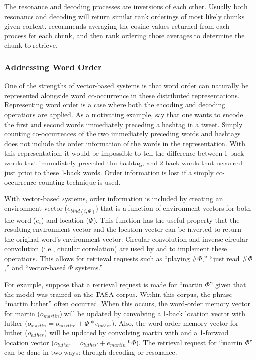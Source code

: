\documentclass[man,floatsintext,donotrepeattitle]{apa6}
\begin{document}
The resonance and decoding processes are inversions of each other.
Usually both resonance and decoding will return similar rank orderings of most likely chunks given context.
\textcite{Jones2007} recommends averaging the cosine values returned from each process for each chunk, and then rank ordering those averages to determine the chunk to retrieve.

\subsubsection{Addressing Word Order}

One of the strengths of vector-based systems is that word order can naturally be represented alongside word co-occurrence in these distributed representations.
Representing word order is a case where both the encoding and decoding operations are applied.
As a motivating example, say that one wants to encode the first and second words immediately preceding a hashtag in a tweet.
Simply counting co-occurrences of the two immediately preceding words and hashtags does not include the order information of the words in the representation.
With this representation, it would be impossible to tell the difference between 1-back words that immediately preceded the hashtag, and 2-back words that occurred just prior to these 1-back words.
Order information is lost if a simply co-occurrence counting technique is used.

With vector-based systems, order information is included by creating an environment vector ($e_{bind(i,\Phi)}$) that is a function of environment vectors for both the word ($e_{i}$) and location ($\Phi$).
This function has the useful property that the resulting environment vector and the location vector can be inverted to return the original word's environment vector.
Circular convolution and inverse circular convolution (i.e., circular correlation) are used by \textcite{Plate1995} and \textcite{Jones2007} to implement these operations.
This allows for retrieval requests such as ``playing \#$\Phi$,'' ``just read \#$\Phi$,'' and ``vector-based $\Phi$ systems.''

For example, suppose that a retrieval request is made for ``martin $\Phi$'' given that the model was trained on the TASA corpus.
Within this corpus, the phrase ``martin luther'' often occurred.
When this occurs, the word-order memory vector for martin ($o_{martin}$) will be updated by convolving a 1-back location vector with luther ($o_{martin} = o_{martin'} + \Phi * e_{luther}$).
Also, the word-order memory vector for luther ($o_{luther}$) will be updated by convolving martin with and a 1-forward location vector ($o_{luther} = o_{luther'} + e_{martin} * \Phi$).
The retrieval request for ``martin $\Phi$'' can be done in two ways: through decoding or resonance.
\end{document}
